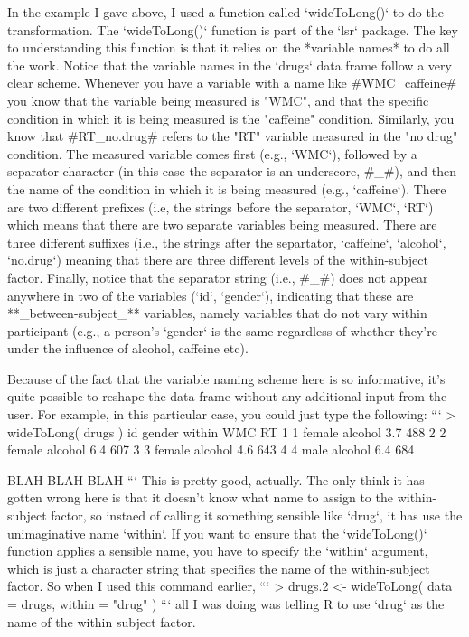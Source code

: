 In the example I gave above, I used a function called `wideToLong()` to do the transformation. The `wideToLong()` function is part of the `lsr` package. The key to understanding this function is that it relies on the *variable names* to do all the work. Notice that the variable names in the `drugs` data frame follow a very clear scheme. Whenever you have a variable with a name like \rtextverb#WMC_caffeine# you know that the variable being measured is "WMC", and that the specific condition in which it is being measured is the "caffeine" condition. Similarly, you know that \rtextverb#RT_no.drug# refers to the "RT" variable measured in the "no drug" condition. The measured variable comes first (e.g., `WMC`), followed by a separator character (in this case the separator is an underscore, \rtextverb#_#), and then the name of the condition in which it is being measured (e.g., `caffeine`). There are two different prefixes (i.e, the strings before the separator, `WMC`, `RT`) which means that there are two separate variables being measured. There are three different suffixes (i.e., the strings after the separtator, `caffeine`, `alcohol`, `no.drug`) meaning that there are three different levels of the within-subject factor. Finally, notice that the separator string (i.e., \rtextverb#_#) does not appear anywhere in two of the variables (`id`, `gender`), indicating that these are **_between-subject_** variables, namely variables that do not vary within participant (e.g., a person's `gender` is the same regardless of whether they're under the influence of alcohol, caffeine etc).

Because of the fact that the variable naming scheme here is so informative, it's quite possible to reshape the data frame without any additional input from the user. For example, in this particular case, you could just type the following:
```
> wideToLong( drugs )
   id gender   within WMC  RT
1   1 female  alcohol 3.7 488
2   2 female  alcohol 6.4 607
3   3 female  alcohol 4.6 643
4   4   male  alcohol 6.4 684

BLAH BLAH BLAH
```
This is pretty good, actually. The only think it has gotten wrong here is that it doesn't know what name to assign to the within-subject factor, so instaed of calling it something sensible like `drug`, it has use the unimaginative name `within`. If you want to ensure that the `wideToLong()` function applies a sensible name, you have to specify the `within` argument, which is just a character string that specifies the name of the within-subject factor. So when I used this command earlier,
```
> drugs.2 <- wideToLong( data = drugs, within = "drug" )
```
all I was doing was telling R to use `drug` as the name of the within subject factor. 

